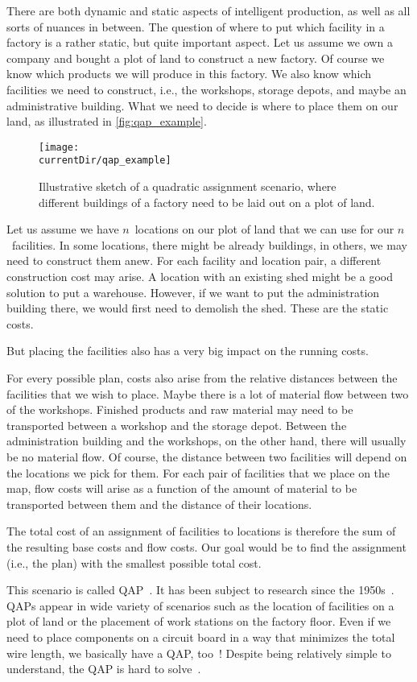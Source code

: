 %
%
There are both dynamic and static aspects of intelligent production, as well as all sorts of nuances in between.
The question of where to put which facility in a factory is a rather static, but quite important aspect.
Let us assume we own a company and bought a plot of land to construct a new factory.
Of course we know which products we will produce in this factory.
We also know which facilities we need to construct, i.e., the workshops, storage depots, and maybe an administrative building.
What we need to decide is where to place them on our land, as illustrated in \autoref{fig:qap_example}.%
%
\begin{figure}%
\centering%
\texttt{[image: \\currentDir/qap\_example]}%
\caption{Illustrative sketch of a quadratic assignment scenario, where different buildings of a factory need to be laid out on a plot of land.}%
\label{fig:qap_example}%
\end{figure}%

Let us assume we have $n$~locations on our plot of land that we can use for our $n$~facilities.
In some locations, there might be already buildings, in others, we may need to construct them anew.
For each facility and location pair, a different construction cost may arise.
A location with an existing shed might be a good solution to put a warehouse.
However, if we want to put the administration building there, we would first need to demolish the shed.
These are the static costs.

But placing the facilities also has a very big impact on the running costs.

For every possible plan, costs also arise from the relative distances between the facilities that we wish to place.
Maybe there is a lot of material flow between two of the workshops.
Finished products and raw material may need to be transported between a workshop and the storage depot.
Between the administration building and the workshops, on the other hand, there will usually be no material flow.
Of course, the distance between two facilities will depend on the locations we pick for them.
For each pair of facilities that we place on the map, flow costs will arise as a function of the amount of material to be transported between them and the distance of their locations.

The total cost of an assignment of facilities to locations is therefore the sum of the resulting base costs and flow costs.
Our goal would be to find the assignment (i.e., the plan) with the smallest possible total cost.

This scenario is called \acrfull{QAP}~\cite{BCPP1998TQAP}.
It has been subject to research since the 1950s~\cite{BK1957APATLOEA}.
\glspl{QAP} appear in wide variety of scenarios such as the location of facilities on a plot of land or the placement of work stations on the factory floor.
Even if we need to place components on a circuit board in a way that minimizes the total wire length, we basically have a \gls{QAP}, too~\cite{S1961TBWPAPA}!
Despite being relatively simple to understand, the \gls{QAP} is hard to solve~\cite{SGA1976PCAP}.
%
\endhsection%
%
